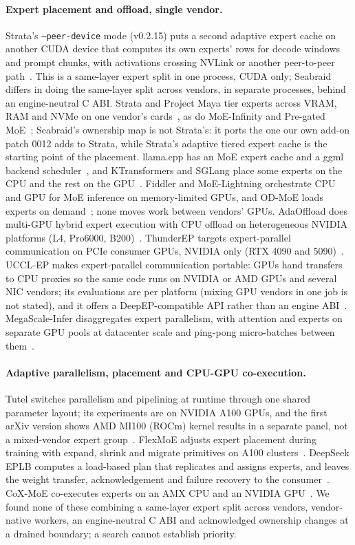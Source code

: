 \documentclass[11pt]{article}
\newcommand{\product}{Seabraid}                 %
\begin{document}
\paragraph{Expert placement and offload, single vendor.} Strata's \texttt{--peer-device} mode (v0.2.15) puts a second
adaptive expert cache on another CUDA device that computes its own experts' rows for decode windows and prompt chunks,
with activations crossing NVLink or another peer-to-peer path~\cite{strata}. This is a same-layer expert split in one
process, CUDA only; \product{} differs in doing the same-layer split across vendors, in separate processes, behind an
engine-neutral C ABI. Strata and Project Maya tier experts across VRAM, RAM and NVMe on one vendor's
cards~\cite{strata,maya}, as do MoE-Infinity and Pre-gated MoE~\cite{moeinfinity,pregated}; \product's ownership map is not Strata's: it ports the one our own add-on patch 0012 adds to Strata, while Strata's adaptive tiered expert cache is the starting point of the placement. llama.cpp has an MoE expert cache and a ggml
backend scheduler~\cite{llamacpp,ggml}, and KTransformers and SGLang place some experts on the CPU and the rest on
the GPU~\cite{ktransformers,sglang}. Fiddler and MoE-Lightning orchestrate CPU and GPU for MoE inference on
memory-limited GPUs, and OD-MoE loads experts on demand~\cite{fiddler,moelightning,odmoe}; none moves work between
vendors' GPUs. AdaOffload does multi-GPU hybrid expert execution with CPU offload on heterogeneous NVIDIA platforms
(L4, Pro6000, B200)~\cite{adaoffload}. ThunderEP targets expert-parallel communication on PCIe consumer GPUs, NVIDIA
only (RTX 4090 and 5090)~\cite{thunderep}. UCCL-EP makes expert-parallel communication portable: GPUs hand transfers
to CPU proxies so the same code runs on NVIDIA or AMD GPUs and several NIC vendors; its evaluations are per platform
(mixing GPU vendors in one job is not stated), and it offers a DeepEP-compatible API rather than an engine
ABI~\cite{uccl}. MegaScale-Infer disaggregates expert parallelism, with attention and experts on separate GPU pools at
datacenter scale and ping-pong micro-batches between them~\cite{megascale}.

\paragraph{Adaptive parallelism, placement and CPU-GPU co-execution.} Tutel switches parallelism and pipelining at
runtime through one shared parameter layout; its experiments are on NVIDIA A100 GPUs, and the first arXiv version shows
AMD MI100 (ROCm) kernel results in a separate panel, not a mixed-vendor expert group~\cite{tutel}. FlexMoE adjusts
expert placement during training with expand, shrink and migrate primitives on A100 clusters~\cite{flexmoe}. DeepSeek
EPLB computes a load-based plan that replicates and assigns experts, and leaves the weight transfer, acknowledgement
and failure recovery to the consumer~\cite{eplb}. CoX-MoE co-executes experts on an AMX CPU and an NVIDIA GPU~\cite{coxmoe}.
We found none of these combining a same-layer expert split across vendors, vendor-native workers, an engine-neutral C ABI and acknowledged ownership changes at a drained boundary; a search cannot establish priority.
\end{document}
